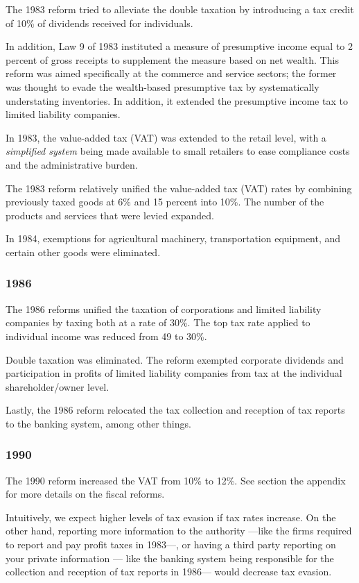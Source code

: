 \documentclass[
  12pt]{article}
\begin{document}
The 1983 reform tried to alleviate the double taxation by introducing a
tax credit of 10\% of dividends received for individuals.

In addition, Law 9 of 1983 instituted a measure of presumptive income
equal to 2 percent of gross receipts to supplement the measure based on
net wealth. This reform was aimed specifically at the commerce and
service sectors; the former was thought to evade the wealth-based
presumptive tax by systematically understating inventories. In addition,
it extended the presumptive income tax to limited liability companies.

In 1983, the value-added tax (VAT) was extended to the retail level,
with a \emph{simplified system} being made available to small retailers
to ease compliance costs and the administrative burden.

The 1983 reform relatively unified the value-added tax (VAT) rates by
combining previously taxed goods at 6\% and 15 percent into 10\%. The
number of the products and services that were levied expanded.

In 1984, exemptions for agricultural machinery, transportation
equipment, and certain other goods were eliminated.

\hypertarget{section-1}{%
\subsubsection{1986}\label{section-1}}

The 1986 reforms unified the taxation of corporations and limited
liability companies by taxing both at a rate of 30\%. The top tax rate
applied to individual income was reduced from 49 to 30\%.

Double taxation was eliminated. The reform exempted corporate dividends
and participation in profits of limited liability companies from tax at
the individual shareholder/owner level.

Lastly, the 1986 reform relocated the tax collection and reception of
tax reports to the banking system, among other things.

\hypertarget{section-2}{%
\subsubsection{1990}\label{section-2}}

The 1990 reform increased the VAT from 10\% to 12\%. See section the
appendix for more details on the fiscal reforms.

Intuitively, we expect higher levels of tax evasion if tax rates
increase. On the other hand, reporting more information to the authority
---like the firms required to report and pay profit taxes in 1983---, or
having a third party reporting on your private information --- like the
banking system being responsible for the collection and reception of tax
reports in 1986--- would decrease tax evasion.
\end{document}
